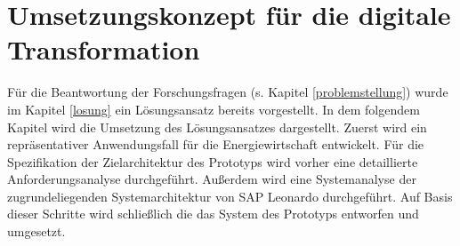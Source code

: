 \section{Umsetzungskonzept für die digitale Transformation}

Für die Beantwortung der Forschungsfragen (s. Kapitel \ref{problemstellung}) wurde im Kapitel \ref{losung} ein Lösungsansatz bereits vorgestellt. In dem folgendem Kapitel wird die Umsetzung des Lösungsansatzes dargestellt. Zuerst wird ein repräsentativer Anwendungsfall für die Energiewirtschaft entwickelt. Für die Spezifikation der Zielarchitektur des Prototyps wird vorher eine detaillierte Anforderungsanalyse durchgeführt. Außerdem wird eine Systemanalyse der zugrundeliegenden Systemarchitektur von SAP Leonardo durchgeführt. Auf Basis dieser Schritte wird schließlich die das System des Prototyps entworfen und umgesetzt. 

 
 
 



